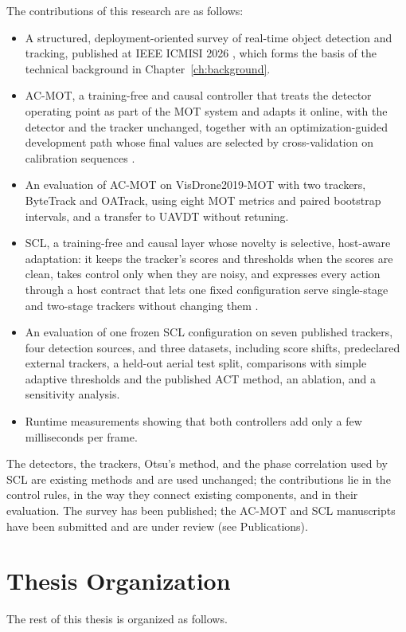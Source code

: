 The contributions of this research are as follows:
\begin{itemize}
\item A structured, deployment-oriented survey of real-time object detection and tracking, published at IEEE ICMISI 2026 \cite{ismail2026realtime}, which forms the basis of the technical background in Chapter~\ref{ch:background}.
\item AC-MOT, a training-free and causal controller that treats the detector operating point as part of the MOT system and adapts it online, with the detector and the tracker unchanged, together with an optimization-guided development path whose final values are selected by cross-validation on calibration sequences \cite{ismail2026acmot}.
\item An evaluation of AC-MOT on VisDrone2019-MOT with two trackers, ByteTrack and OATrack, using eight MOT metrics and paired bootstrap intervals, and a transfer to UAVDT without retuning.
\item SCL, a training-free and causal layer whose novelty is selective, host-aware adaptation: it keeps the tracker's scores and thresholds when the scores are clean, takes control only when they are noisy, and expresses every action through a host contract that lets one fixed configuration serve single-stage and two-stage trackers without changing them \cite{ismail2026scl}.
\item An evaluation of one frozen SCL configuration on seven published trackers, four detection sources, and three datasets, including score shifts, predeclared external trackers, a held-out aerial test split, comparisons with simple adaptive thresholds and the published ACT method, an ablation, and a sensitivity analysis.
\item Runtime measurements showing that both controllers add only a few milliseconds per frame.
\end{itemize}
The detectors, the trackers, Otsu's method, and the phase correlation used by SCL are existing methods and are used unchanged; the contributions lie in the control rules, in the way they connect existing components, and in their evaluation. The survey has been published; the AC-MOT and SCL manuscripts have been submitted and are under review (see Publications).

\section{Thesis Organization}\label{sec:intro-organization}
The rest of this thesis is organized as follows.

